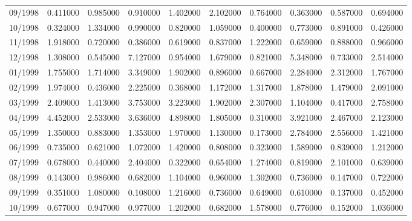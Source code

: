 \begin{tabular}{lrrrrrrrrr}
09/1998 & 0.411000 & 0.985000 & 0.910000 & 1.402000 & 2.102000 & 0.764000 & 0.363000 & 0.587000 & 0.694000 \\
10/1998 & 0.324000 & 1.334000 & 0.990000 & 0.820000 & 1.059000 & 0.400000 & 0.773000 & 0.891000 & 0.426000 \\
11/1998 & 1.918000 & 0.720000 & 0.386000 & 0.619000 & 0.837000 & 1.222000 & 0.659000 & 0.888000 & 0.966000 \\
12/1998 & 1.308000 & 0.545000 & 7.127000 & 0.954000 & 1.679000 & 0.821000 & 5.348000 & 0.733000 & 2.514000 \\
01/1999 & 1.755000 & 1.714000 & 3.349000 & 1.902000 & 0.896000 & 0.667000 & 2.284000 & 2.312000 & 1.767000 \\
02/1999 & 1.974000 & 0.436000 & 2.225000 & 0.368000 & 1.172000 & 1.317000 & 1.878000 & 1.479000 & 2.091000 \\
03/1999 & 2.409000 & 1.413000 & 3.753000 & 3.223000 & 1.902000 & 2.307000 & 1.104000 & 0.417000 & 2.758000 \\
04/1999 & 4.452000 & 2.533000 & 3.636000 & 4.898000 & 1.805000 & 0.310000 & 3.921000 & 2.467000 & 2.123000 \\
05/1999 & 1.350000 & 0.883000 & 1.353000 & 1.970000 & 1.130000 & 0.173000 & 2.784000 & 2.556000 & 1.421000 \\
06/1999 & 0.735000 & 0.621000 & 1.072000 & 1.420000 & 0.808000 & 0.323000 & 1.589000 & 0.839000 & 1.212000 \\
07/1999 & 0.678000 & 0.440000 & 2.404000 & 0.322000 & 0.654000 & 1.274000 & 0.819000 & 2.101000 & 0.639000 \\
08/1999 & 0.143000 & 0.986000 & 0.682000 & 1.104000 & 0.960000 & 1.302000 & 0.736000 & 0.147000 & 0.722000 \\
09/1999 & 0.351000 & 1.080000 & 0.108000 & 1.216000 & 0.736000 & 0.649000 & 0.610000 & 0.137000 & 0.452000 \\
10/1999 & 0.677000 & 0.947000 & 0.977000 & 1.202000 & 0.682000 & 1.578000 & 0.776000 & 0.152000 & 1.036000 \\
\bottomrule
\end{tabular}
